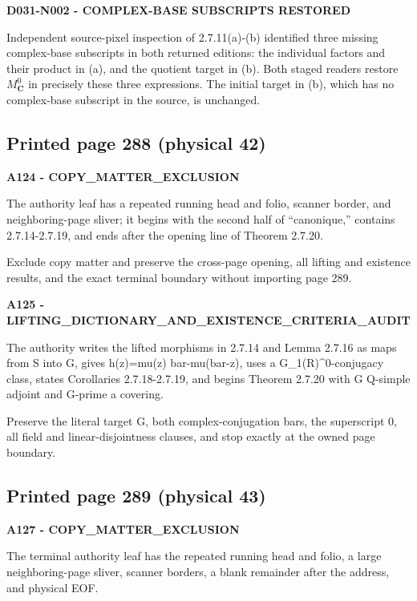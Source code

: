 \documentclass[10pt,a4paper]{article}
\begin{document}
\textbf{D031-N002 - COMPLEX-BASE SUBSCRIPTS RESTORED}

Independent source-pixel inspection of 2.7.11(a)-(b) identified three missing complex-base subscripts in both returned editions: the individual factors and their product in (a), and the quotient target in (b). Both staged readers restore \(M^0_{\mathbf C}\) in precisely these three expressions. The initial target in (b), which has no complex-base subscript in the source, is unchanged.

\subsection{Printed page 288 (physical 42)}

\textbf{A124 - COPY\_MATTER\_EXCLUSION}

The authority leaf has a repeated running head and folio, scanner border, and neighboring-page sliver; it begins with the second half of ``canonique,'' contains 2.7.14-2.7.19, and ends after the opening line of Theorem 2.7.20.

Exclude copy matter and preserve the cross-page opening, all lifting and existence results, and the exact terminal boundary without importing page 289.

\textbf{A125 - LIFTING\_DICTIONARY\_AND\_EXISTENCE\_CRITERIA\_AUDIT}

The authority writes the lifted morphisms in 2.7.14 and Lemma 2.7.16 as maps from S into G, gives h(z)=mu(z) bar-mu(bar-z), uses a G\_1(R)\^{}0-conjugacy class, states Corollaries 2.7.18-2.7.19, and begins Theorem 2.7.20 with G Q-simple adjoint and G-prime a covering.

Preserve the literal target G, both complex-conjugation bars, the superscript 0, all field and linear-disjointness clauses, and stop exactly at the owned page boundary.

\subsection{Printed page 289 (physical 43)}

\textbf{A127 - COPY\_MATTER\_EXCLUSION}

The terminal authority leaf has the repeated running head and folio, a large neighboring-page sliver, scanner borders, a blank remainder after the address, and physical EOF.
\end{document}
